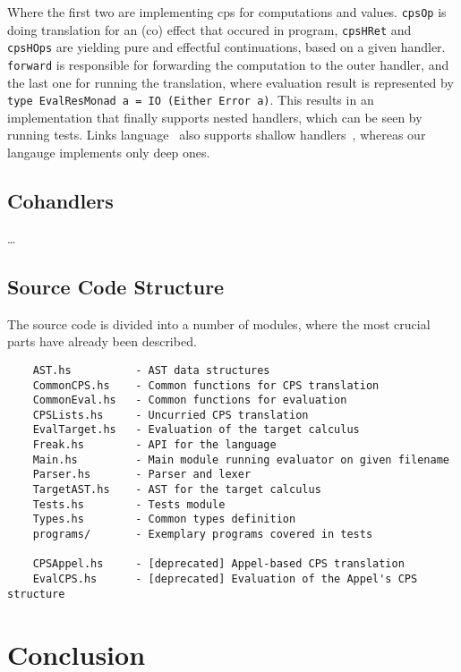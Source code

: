 \documentclass[declaration,shortabstract]{iithesis}
\theoremstyle{definition} \newtheorem{definition}{Definition}[chapter]
\theoremstyle{remark} \newtheorem{remark}[definition]{Observation}
\theoremstyle{plain} \newtheorem{theorem}[definition]{Theorem}
\theoremstyle{plain} \newtheorem{lemma}[definition]{Lemma}
\begin{document}
    \noindent
    Where the first two are implementing cps for computations and values.
    \verb!cpsOp! is doing translation for an (co) effect that occured in program,
    \verb!cpsHRet! and \verb!cpsHOps! are yielding pure and effectful continuations,
    based on a given handler. \verb!forward! is responsible for forwarding the
    computation to the outer handler, and the last one for running the
    translation, where evaluation result is represented by\\
    \verb!type EvalResMonad a = IO (Either Error a)!. This results in an
    implementation that finally supports nested handlers, which can be seen by
    running tests. Links language~\cite{handlers-cps-journal} also supports
    shallow handlers~\cite{shallow-handlers}, whereas our langauge implements
    only deep ones.

    \section{Cohandlers}
    \ldots

    \section{Source Code Structure}

    The source code is divided into a number of modules, where the most
    crucial parts have already been described.

\begin{verbatim}
    AST.hs          - AST data structures
    CommonCPS.hs    - Common functions for CPS translation
    CommonEval.hs   - Common functions for evaluation
    CPSLists.hs     - Uncurried CPS translation
    EvalTarget.hs   - Evaluation of the target calculus
    Freak.hs        - API for the language
    Main.hs         - Main module running evaluator on given filename
    Parser.hs       - Parser and lexer
    TargetAST.hs    - AST for the target calculus
    Tests.hs        - Tests module
    Types.hs        - Common types definition
    programs/       - Exemplary programs covered in tests

    CPSAppel.hs     - [deprecated] Appel-based CPS translation
    EvalCPS.hs      - [deprecated] Evaluation of the Appel's CPS structure
\end{verbatim}

\chapter{Conclusion}\label{chapter:conclusion}
\end{document}
